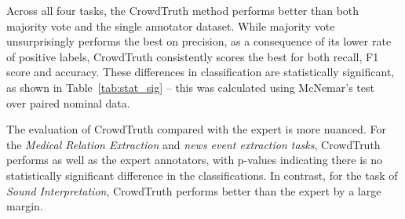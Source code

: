 \begin{table}
\centering
{}
\caption{$p$-values for McNemar's test of statistical significance in the CrowdTruth classification, compared with the others.}
\label{tab:stat_sig}
\end{table}

Across all four tasks, the CrowdTruth method performs better than both majority vote and the single annotator dataset.  While majority vote unsurprisingly performs the best on precision, as a consequence of its lower rate of positive labels, CrowdTruth consistently scores the best for both recall, F1 score and accuracy.  These differences in classification are statistically significant, as shown in Table~\ref{tab:stat_sig} -- this was calculated using McNemar's test~\cite{mcnemar1947note} over paired nominal data.

The evaluation of CrowdTruth compared with the expert is more nuanced. For the \textit{Medical Relation Extraction} and \textit{news event extraction tasks}, CrowdTruth performs as well as the expert annotators, with p-values indicating there is no statistically significant difference in the classifications.  In contrast, for the task of \textit{Sound Interpretation}, CrowdTruth performs better than the expert by a large margin.

